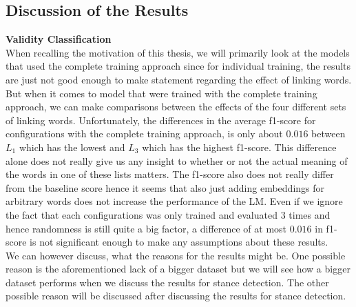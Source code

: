 \subsection{Discussion of the Results}
\textbf{Validity Classification} \\
When recalling the motivation of this thesis, we will primarily look at the models that used the complete training approach since for individual training, the results are just not good enough to make statement regarding the effect of linking words. But when it comes to model that were trained with the complete training approach, we can make comparisons between the effects of the four different sets of linking words. Unfortunately, the differences in the average f1-score for configurations with the complete training approach, is only about $0.016$ between $L_1$ which has the lowest and $L_3$ which has the highest f1-score. This difference alone does not really give us any insight to whether or not the actual meaning of the words in one of these lists matters. The f1-score also does not really differ from the baseline score hence it seems that also just adding embeddings for arbitrary words does not increase the performance of the LM. Even if we ignore the fact that each configurations was only trained and evaluated $3$ times and hence randomness is still quite a big factor, a difference of at most $0.016$ in f1-score is not significant enough to make any assumptions about these results. \\
We can however discuss, what the reasons for the results might be. One possible reason is the aforementioned lack of a bigger dataset but we will see how a bigger dataset performs when we discuss the results for stance detection. The other possible reason will be discussed after discussing the results for stance detection. \\

